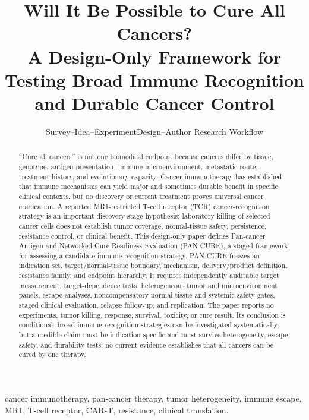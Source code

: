 \documentclass[10pt,conference]{IEEEtran}
\begin{document}
\title{Will It Be Possible to Cure All Cancers?\\A Design-Only Framework for Testing Broad Immune Recognition and Durable Cancer Control}
\author{Survey--Idea--ExperimentDesign--Author Research Workflow}
\maketitle
\begin{abstract}
``Cure all cancers'' is not one biomedical endpoint because cancers differ by tissue, genotype, antigen presentation, immune microenvironment, metastatic route, treatment history, and evolutionary capacity. Cancer immunotherapy has established that immune mechanisms can yield major and sometimes durable benefit in specific clinical contexts, but no discovery or current treatment proves universal cancer eradication. A reported MR1-restricted T-cell receptor (TCR) cancer-recognition strategy is an important discovery-stage hypothesis; laboratory killing of selected cancer cells does not establish tumor coverage, normal-tissue safety, persistence, resistance control, or clinical benefit. This design-only paper defines Pan-cancer Antigen and Networked Cure Readiness Evaluation (PAN-CURE), a staged framework for assessing a candidate immune-recognition strategy. PAN-CURE freezes an indication set, target/normal-tissue boundary, mechanism, delivery/product definition, resistance family, and endpoint hierarchy. It requires independently auditable target measurement, target-dependence tests, heterogeneous tumor and microenvironment panels, escape analyses, noncompensatory normal-tissue and systemic safety gates, staged clinical evaluation, relapse follow-up, and replication. The paper reports no experiments, tumor killing, response, survival, toxicity, or cure result. Its conclusion is conditional: broad immune-recognition strategies can be investigated systematically, but a credible claim must be indication-specific and must survive heterogeneity, escape, safety, and durability tests; no current evidence establishes that all cancers can be cured by one therapy.
\end{abstract}
\begin{IEEEkeywords}cancer immunotherapy, pan-cancer therapy, tumor heterogeneity, immune escape, MR1, T-cell receptor, CAR-T, resistance, clinical translation.\end{IEEEkeywords}
\end{document}
